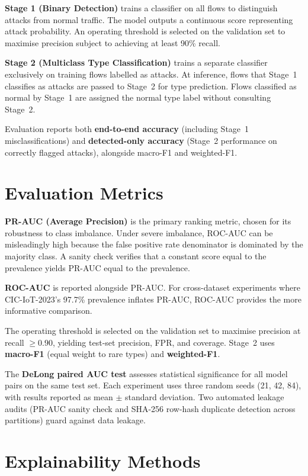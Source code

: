 \documentclass[12pt,a4paper]{report}
\begin{document}
\textbf{Stage 1 (Binary Detection)} trains a classifier on all flows to distinguish attacks from normal traffic. The model outputs a continuous score representing attack probability. An operating threshold is selected on the validation set to maximise precision subject to achieving at least 90\% recall.

\textbf{Stage 2 (Multiclass Type Classification)} trains a separate classifier exclusively on training flows labelled as attacks. At inference, flows that Stage~1 classifies as attacks are passed to Stage~2 for type prediction. Flows classified as normal by Stage~1 are assigned the normal type label without consulting Stage~2.

Evaluation reports both \textbf{end-to-end accuracy} (including Stage~1 misclassifications) and \textbf{detected-only accuracy} (Stage~2 performance on correctly flagged attacks), alongside macro-F1 and weighted-F1.

\section{Evaluation Metrics}
\label{sec:metrics}

\textbf{PR-AUC (Average Precision)} is the primary ranking metric, chosen for its robustness to class imbalance. Under severe imbalance, ROC-AUC can be misleadingly high because the false positive rate denominator is dominated by the majority class. A sanity check verifies that a constant score equal to the prevalence yields PR-AUC equal to the prevalence.

\textbf{ROC-AUC} is reported alongside PR-AUC. For cross-dataset experiments where CIC-IoT-2023's 97.7\% prevalence inflates PR-AUC, ROC-AUC provides the more informative comparison.

The operating threshold is selected on the validation set to maximise precision at recall $\geq 0.90$, yielding test-set precision, FPR, and coverage. Stage~2 uses \textbf{macro-F1} (equal weight to rare types) and \textbf{weighted-F1}.

The \textbf{DeLong paired AUC test} \cite{delong1988} assesses statistical significance for all model pairs on the same test set. Each experiment uses three random seeds (21, 42, 84), with results reported as mean $\pm$ standard deviation. Two automated leakage audits (PR-AUC sanity check and SHA-256 row-hash duplicate detection across partitions) guard against data leakage.

\section{Explainability Methods}
\label{sec:xai-methods}
\end{document}
